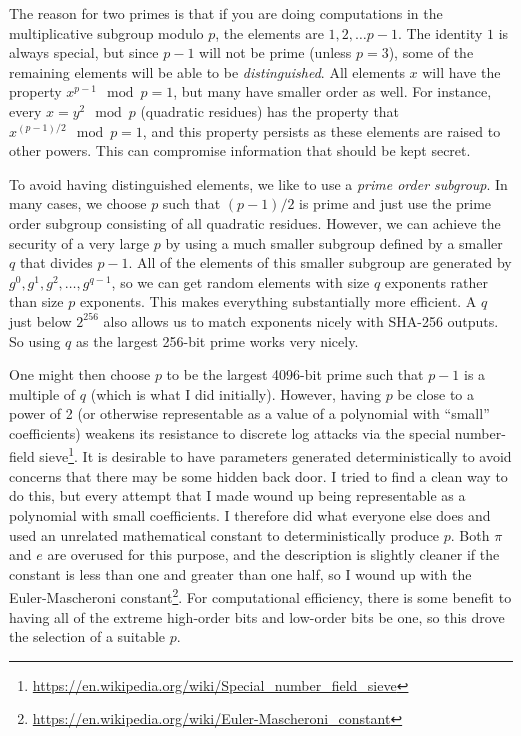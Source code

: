 \documentclass[letterpaper,12pt]{article}
\begin{document}
The reason for two primes is that if you are doing computations in the
multiplicative subgroup modulo $p$, the elements are ${1,2,\ldots p-1}$. The
identity $1$ is always special, but since $p-1$ will not be prime (unless
$p=3$), some of the remaining elements will be able to be {\em distinguished}.
All elements $x$ will have the property $x^{p-1}\mod p = 1$, but many have
smaller order as well. For instance, every $x=y^2\mod p$ (quadratic
residues) has the property that $x^{(p-1)/2}\mod p = 1$, and this
property persists as these elements are raised to other powers. This
can compromise information that should be kept secret.
 

To avoid having distinguished elements, we like to use a {\em prime order
subgroup}. In many cases, we choose $p$ such that $(p-1)/2$ is prime and
just use the prime order subgroup consisting of all quadratic
residues. However, we can achieve the security of a very large $p$ by
using a much smaller subgroup defined by a smaller $q$ that divides
$p-1$. All of the elements of this smaller subgroup are generated by
$g^0,g^1, g^2,\ldots, g^{q-1}$, so we can get random elements with size $q$
exponents rather than size $p$ exponents. This makes everything
substantially more efficient. A $q$ just below $2^{256}$ also allows us to
match exponents nicely with SHA-256 outputs. So using $q$ as the largest
256-bit prime works very nicely.
 

One might then choose $p$ to be the largest 4096-bit prime such that
$p-1$ is a multiple of $q$ (which is what I did initially).  However,
having $p$ be close to a power of 2 (or otherwise representable as a
value of a polynomial with ``small'' coefficients) weakens its
resistance to discrete log attacks via the special number-field
sieve\footnote{\url{https://en.wikipedia.org/wiki/Special_number_field_sieve}}.
It is desirable to have parameters generated deterministically to
avoid concerns that there may be some hidden back door.  I tried to
find a clean way to do this, but every attempt that I made wound up
being representable as a polynomial with small coefficients.  I
therefore did what everyone else does and used an unrelated
mathematical constant to deterministically produce $p$.  Both $\pi$
and $e$ are overused for this purpose, and the description is slightly cleaner
if the constant is less than one and greater than one half, so I wound
up with the Euler-Mascheroni
constant\footnote{\url{https://en.wikipedia.org/wiki/Euler-Mascheroni_constant}}.
For computational efficiency,
there is some benefit to having all of the extreme high-order bits and
low-order bits be one, so this drove the selection of a suitable $p$.
\end{document}

